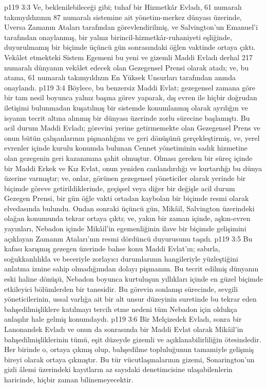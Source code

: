 \vs p119 3:3 Ve, beklenilebileceği gibi; tuhaf bir Hizmetkâr Evladı, 61 numaralı takımyıldızının 87 numaralı sistemine ait yönetim\hyp{}merkez dünyası üzerinde, Uversa Zamanın Ataları tarafından görevlendirilmiş, ve Salvington’un Emanuel’i tarafından onaylanmış, bir yalnız birincil\hyp{}hizmetkâr\hyp{}ruhaniyeti eşliğinde, duyurulmamış bir biçimde üçüncü gün sonrasındaki öğlen vaktinde ortaya çıktı. Vekâlet etmekteki Sistem Egemeni bu yeni ve gizemli Maddi Evladı derhal 217 numaralı dünyanın vekâlet edecek olan Gezegensel Prensi olarak atadı; ve, bu atama, 61 numaralı takımyıldızın En Yüksek Unsurları tarafından anında onaylandı.
\vs p119 3:4 Böylece, bu benzersiz Maddi Evlat; gezegensel zamana göre bir tam nesil boyunca yalnız başına görev yaparak, dış evren ile hiçbir doğrudan iletişimi bulunmadan kuşatılmış bir sistemde konumlanmış olarak ayrılığın ve isyanın tecrit altına alınmış bir dünyası üzerinde zorlu sürecine başlamıştı. Bu acil durum Maddi Evladı; görevini yerine getirmemekte olan Gezegensel Prens ve onun bütün çalışanlarının pişmanlığını ve geri dönüşünü gerçekleştirmiş, ve, yerel evrenler içinde kurulu konumda bulunan Cennet yönetiminin sadık hizmetine olan gezegenin geri kazanımına şahit olmuştur. Olması gereken bir süreç içinde bir Maddi Erkek ve Kız Evlat, onun yeniden canlandırdığı ve kurtardığı bu dünya üzerine varmıştır; ve, onlar, görünen gezegensel yöneticiler olarak yerinde bir biçimde göreve getirildiklerinde, geçişsel veya diğer bir değişle acil durum Gezegen Prensi, bir gün öğle vakti ortadan kaybolan bir biçimde resmi olarak elvedasında bulundu. Ondan sonraki üçüncü gün, Mikâil, Salvington üzerindeki olağan konumunda tekrar ortaya çıktı; ve, yakın bir zaman içinde, aşkın\hyp{}evren yayınları, Nebadon içinde Mikâil’in egemenliğinin ilave bir biçimde gelişimini açıklayan Zamanın Ataları’nın resmi dördüncü duyurusunu taşıdı.
\vs p119 3:5 Bu kafası karışmış gezegen üzerinde bahse konu Maddi Evlat’ın; sabırla, soğukkanlılıkla ve beceriyle zorlayıcı durumlarının hangileriyle yüzleştiğini anlatma iznine sahip olmadığımdan dolayı pişmanım. Bu tecrit edilmiş dünyanın eski haline dönüşü, Nebadon boyunca kurtuluşun yıllıkları içinde en güzel biçimde etkileyici bölümlerden bir tanesidir. Bu görevin sonlanışı sürecinde, sevgili yöneticilerinin, ussal varlığa ait bir alt unsur düzeyinin suretinde bu tekrar eden bahşedilmişliklere katılmayı tercih etme nedeni tüm Nebadon için oldukça anlaşılır hale gelmiş konumdaydı.
\vs p119 3:6 Bir Melçizedek Evladı, sonra bir Lanonandek Evladı ve onun da sonrasında bir Maddi Evlat olarak Mikâil’in bahşedilmişliklerinin tümü, eşit düzeyde gizemli ve açıklanabilirliliğin ötesindedir. Her birinde o,  ortaya çıkmış olup, bahşedilme topluluğunun tamamiyle gelişmiş bireyi olarak ortaya çıkmıştır. Bu tür vücutlaşmalarının gizemi, Sonarington’un gizli âlemi üzerindeki kayıtların az sayıdaki denetimcisine ulaşabilenlerin haricinde, hiçbir zaman bilinemeyecektir.

